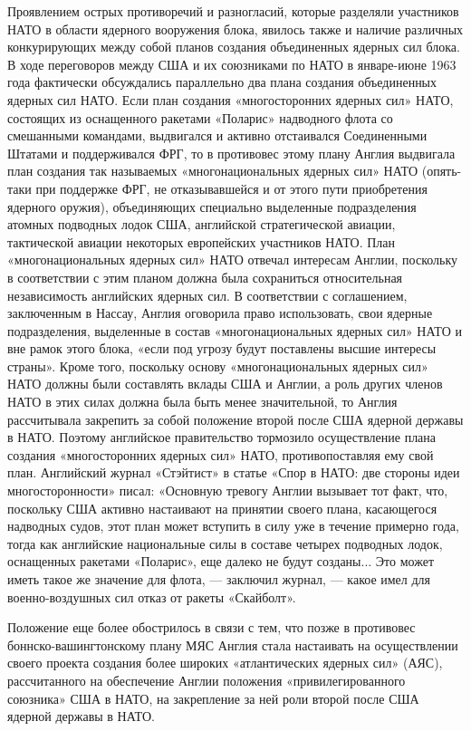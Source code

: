 \documentclass[12pt, a4paper, openany]{book}
\begin{document}
		Проявлением острых противоречий и разногласий, которые разделяли участников НАТО в области ядерного вооружения блока, явилось также и наличие различных конкурирующих между собой планов создания объединенных ядерных сил блока. В ходе переговоров между США и их союзниками по НАТО в январе-июне 1963 года фактически обсуждались параллельно два плана создания объединенных ядерных сил НАТО. Если план создания «многосторонних ядерных сил» НАТО, состоящих из оснащенного ракетами «Поларис» надводного флота со смешанными командами, выдвигался и активно отстаивался Соединенными Штатами и поддерживался ФРГ, то в противовес этому плану Англия выдвигала план создания так называемых «многонациональных ядерных сил» НАТО (опять-таки при поддержке ФРГ, не отказывавшейся и от этого пути приобретения ядерного оружия), объединяющих специально выделенные подразделения атомных подводных лодок США, английской стратегической авиации, тактической авиации некоторых европейских участников НАТО. План «многонациональных ядерных сил» НАТО отвечал интересам Англии, поскольку в соответствии с этим планом должна была сохраниться относительная независимость английских ядерных сил. В соответствии с соглашением, заключенным в Нассау, Англия оговорила право использовать, свои ядерные подразделения, выделенные в состав «многонациональных ядерных сил» НАТО и вне рамок этого блока, «если под угрозу будут поставлены высшие интересы страны». Кроме того, поскольку основу «многонациональных ядерных сил» НАТО должны были составлять вклады США и Англии, а роль других членов НАТО в этих силах должна была быть менее значительной, то Англия рассчитывала закрепить за собой положение второй после США ядерной державы в НАТО. Поэтому английское правительство тормозило осуществление плана создания «многосторонних ядерных сил» НАТО, противопоставляя ему свой план. Английский журнал «Стэйтист» в статье «Спор в НАТО: две стороны идеи многосторонности» писал: «Основную тревогу Англии вызывает тот факт, что, поскольку США активно настаивают на принятии своего плана, касающегося надводных судов, этот план может вступить в силу уже в течение примерно года, тогда как английские национальные силы в составе четырех подводных лодок, оснащенных ракетами «Поларис», еще далеко не будут созданы... Это может иметь такое же значение для флота, — заключил журнал, — какое имел для военно-воздушных сил отказ от ракеты «Скайболт».
		
		Положение еще более обострилось в связи с тем, что позже в противовес боннско-вашингтонскому плану МЯС Англия стала настаивать на осуществлении своего проекта создания более широких «атлантических ядерных сил» (АЯС), рассчитанного на обеспечение Англии положения «привилегированного союзника» США в НАТО, на закрепление за ней роли второй после США ядерной державы в НАТО.
		
\end{document}
